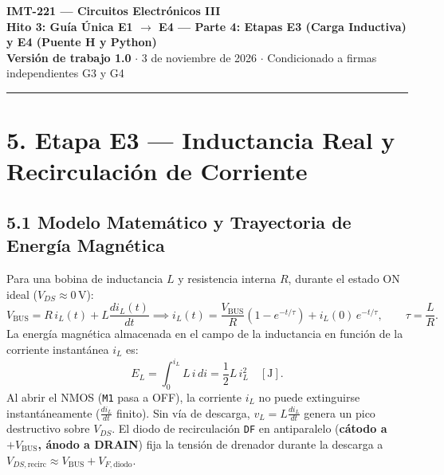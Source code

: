 \documentclass[10pt, a4paper, landscape]{article}
\begin{document}
\noindent
{\LARGE \textbf{\textcolor{ucbblue}{IMT-221 — Circuitos Electrónicos III}}}\\[0.15cm]
{\Large \textbf{Hito 3: Guía Única E1 $\rightarrow$ E4 — Parte 4: Etapas E3 (Carga Inductiva) y E4 (Puente H y Python)}}\\[0.1cm]
{\small \textbf{Versión de trabajo 1.0} $\cdot$ 3 de noviembre de 2026 $\cdot$ Condicionado a firmas independientes G3 y G4}
\par\vspace{0.2cm}\noindent\rule{\linewidth}{0.4pt}\vspace{0.3cm}

\section*{5. Etapa E3 — Inductancia Real y Recirculación de Corriente}

\subsection*{5.1 Modelo Matemático y Trayectoria de Energía Magnética}
Para una bobina de inductancia $L$ y resistencia interna $R$, durante el estado ON ideal ($V_{DS} \approx 0\,\text{V}$):
\begin{equation}
    V_{\text{BUS}} = R\,i_L(t) + L\frac{di_L(t)}{dt} \implies i_L(t) = \frac{V_{\text{BUS}}}{R}\left(1 - e^{-t/\tau}\right) + i_L(0)\,e^{-t/\tau}, \qquad \tau = \frac{L}{R}.
\end{equation}
La energía magnética almacenada en el campo de la inductancia en función de la corriente instantánea $i_L$ es:
\begin{equation}
    E_L = \int_0^{i_L} L\,i\,di = \frac{1}{2}L\,i_L^2 \quad [\text{J}].
\end{equation}
Al abrir el NMOS (\texttt{M1} pasa a OFF), la corriente $i_L$ no puede extinguirse instantáneamente ($\frac{di_L}{dt}$ finito). Sin vía de descarga, $v_L = L\frac{di_L}{dt}$ genera un pico destructivo sobre $V_{DS}$. El diodo de recirculación \texttt{DF} en antiparalelo (\textbf{cátodo a $+V_{\text{BUS}}$, ánodo a DRAIN}) fija la tensión de drenador durante la descarga a $V_{DS,\text{recirc}} \approx V_{\text{BUS}} + V_{F,\text{diodo}}$.
\end{document}
